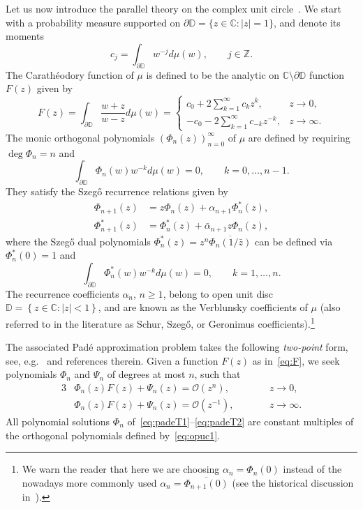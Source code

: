\documentclass[reqno,centertags,11pt,draft]{amsart}
\newcommand{\C}{\mathbb C}
\newcommand{\Z}{\mathbb{Z}}
\newcommand{\T}{\mathbb{\partial\mathbb{D}}}
\newcommand{\D}{\mathbb{D}}
\newcommand{\abs}[1]{\left|#1\right|}
\newcommand{\set}[1]{\left\{#1\right\}}
\begin{document}
Let us now introduce the parallel theory on the complex unit circle~\cites{OPUC1,OPUC2,GeronimusBook,SzegoBook}. We start with  a probability measure supported on  $\T=\{z\in\C: |z|=1\}$, and denote its moments 
$$
c_j = \int_\T w^{-j} d\mu(w), \qquad j\in\Z.
$$
The Carath\'{e}odory function of $\mu$ is defined to be the analytic on $\C\setminus\T$ function $F(z)$ given by
\begin{equation}\label{eq:F}
    F(z) = \int_\T \frac{w+z}{w-z} d\mu(w)
    =
    \begin{cases}
         c_{0} + 2\sum_{k = 1}^{\infty}c_{k}z^k, & z\to0,
         \\
        -c_{0} - 2\sum_{k = 1}^{\infty}c_{-k}z^{-k}, & z\to\infty.
    \end{cases}
\end{equation}
The monic orthogonal polynomials $(\Phi_n(z))_{n = 0}^\infty$ of $\mu$ are defined by requiring $\deg{\Phi_n} = n$ and
\begin{equation}\label{eq:opuc1}
    \int_\T \Phi_n(w)w^{-k} d\mu(w) = 0, \qquad k = 0,\dots,n-1.
\end{equation}
They satisfy the Szeg\H{o} recurrence relations given by
\begin{align}
\label{eq:scalar szego 1}
\Phi_{n+1}(z) & = z\Phi_n(z) + {\alpha}_{n+1}\Phi^*_{n}(z),
\\
\label{eq:scalar szego 2}
\Phi^*_{n+1}(z) & =  \Phi^*_n(z) + \bar\alpha_{n+1}z\Phi_{n}(z),
\end{align}
where the Szeg\H{o} dual polynomials $\Phi_n^*(z) = z^n\overline{\Phi_n(1/\bar z)}$ can be defined via $\Phi_n^*(0)=1$ and
\begin{equation}\label{eq:Phi^*}
    \int_\T \Phi^*_n(w)w^{-k} d\mu(w) = 0, \qquad k = 1,\dots,n.
\end{equation}
The recurrence coefficients $\alpha_n$, $n\ge 1$, belong to open unit disc $\D = \set{z \in \C : \abs{z} < 1}$, and are known as the Verblunsky coefficients of $\mu$ (also referred to in the literature as Schur, Szeg\H{o}, or Geronimus coefficients).\footnote{We warn the reader that here we are choosing $\alpha_n = \Phi_n(0)$ instead of the nowadays more commonly used $\alpha_n = \overline{\Phi_{n+1}(0)}$ %
(see the historical discussion in~\cite[p.10]{OPUC1}).}

The associated Pad\'{e} approximation problem takes the following {\it two-point} form, see, e.g.~\cite{Baker,Bultheel,JNT,PeherstorferSteinbauer} and references therein.
Given a function $F(z)$ as in~\eqref{eq:F}, we seek polynomials $\Phi_n$ and $\Psi_n$ of degrees at most $n$, such that
\begin{alignat}{3}
\label{eq:padeT1}
    & \Phi_{{n}}(z)F(z) + \Psi_{{n}}(z) = \mathcal{O}(z^{n}),  \qquad&& z \rightarrow 0, 
    \\
    \label{eq:padeT2}
    & \Phi_{{n}}(z)F(z) + \Psi_{{n}}(z) = \mathcal{O}(z^{-1}), \qquad && z \rightarrow \infty.
\end{alignat}
All polynomial solutions $\Phi_n$ of~\eqref{eq:padeT1}--\eqref{eq:padeT2} %
are constant multiples of the orthogonal polynomials defined by~\eqref{eq:opuc1}.
\end{document}
